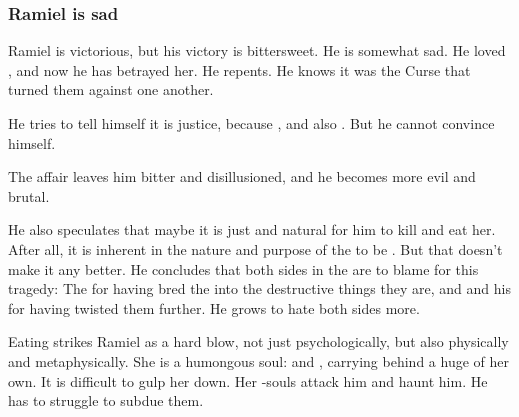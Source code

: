 \subsubsection{Ramiel is sad}
Ramiel is victorious, but his victory is bittersweet. 
He is somewhat sad. 
He loved \Shiaraid, and now he has betrayed her. 
He repents. 
He knows it was the Curse that turned them against one another. 

He tries to tell himself it is justice, because \Delphine{} , and \Shiaraid{} also .
But he cannot convince himself. 

The affair leaves him bitter and disillusioned, and he becomes more evil and brutal. 

He also speculates that maybe it is just and natural for him to kill and eat her. 
After all, it is inherent in the nature and purpose of the \resphain{} to be . 
But that doesn't make it any better. 
He concludes that both sides in the  are to blame for this tragedy: 
The \banelords{} for having bred the \resphain{} into the destructive things they are, and \Nexagglachel{} and his \dragons{} for having twisted them further. 
He grows to hate both sides more. 


Eating \Shiaraid{} strikes Ramiel as a hard blow, not just psychologically, but also physically and metaphysically. 
She is a humongous soul: 
\Sathariah{} and \malach, carrying behind a huge \carcer{} of her own. 
It is difficult to gulp her down. 
Her \carcer-souls attack him and haunt him. 
He has to struggle to subdue them. 







